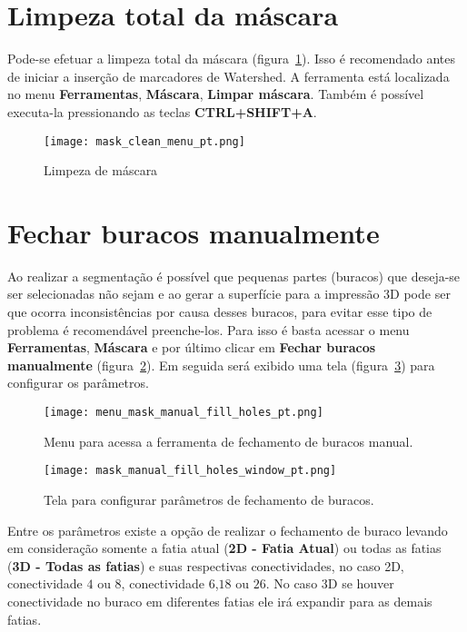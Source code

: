 \section{Limpeza total da máscara}
\label{cap:limpeza_mascara}

Pode-se efetuar a limpeza total da máscara (figura~\ref{fig:limpeza_mascara}). Isso é recomendado antes de iniciar a inserção de marcadores de Watershed. A ferramenta está localizada no menu \textbf{Ferramentas}, \textbf{Máscara}, \textbf{Limpar máscara}. Também é possível executa-la pressionando as teclas \textbf{CTRL+SHIFT+A}.

\begin{figure}[!htb]
\centering
\texttt{[image: mask\_clean\_menu\_pt.png]}
\caption{Limpeza de máscara}
\label{fig:limpeza_mascara}
\end{figure}

\section{Fechar buracos manualmente}

Ao realizar a segmentação é possível que pequenas partes (buracos) que deseja-se ser selecionadas não sejam e ao gerar a superfície para a impressão 3D pode ser que ocorra inconsistências por causa desses buracos, para evitar esse tipo de problema é recomendável preenche-los. Para isso é basta acessar o menu \textbf{Ferramentas}, \textbf{Máscara} e por último clicar em \textbf{Fechar buracos manualmente} (figura~\ref{fig:menu_mask_manual_fill_holes}). Em seguida será exibido uma tela (figura~\ref{fig:mask_manual_fill_holes_window}) para configurar os parâmetros.

\begin{figure}[!htb]
\centering
\texttt{[image: menu\_mask\_manual\_fill\_holes\_pt.png]}
\caption{Menu para acessa a ferramenta de fechamento de buracos manual.}
\label{fig:menu_mask_manual_fill_holes}
\end{figure}

\begin{figure}[!htb]
\centering
\texttt{[image: mask\_manual\_fill\_holes\_window\_pt.png]}
\caption{Tela para configurar parâmetros de fechamento de buracos.}
\label{fig:mask_manual_fill_holes_window}
\end{figure}

Entre os parâmetros existe a opção de realizar o fechamento de buraco levando em consideração somente a fatia atual (\textbf{2D - Fatia Atual}) ou todas as fatias (\textbf{3D - Todas as fatias}) e suas respectivas conectividades, no caso 2D, conectividade $4$ ou $8$, conectividade $6$,$18$ ou $26$. No caso 3D se houver conectividade no buraco em diferentes fatias ele irá expandir para as demais fatias.

